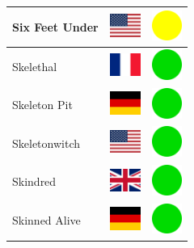 \documentclass[12pt, a4paper, twoside]{report}
\begin{document}
\begin{center}
\begin{longtable}{|p{5cm}|p{2cm}|p{2cm}|}
			Six Feet Under & \includegraphics[width=1cm]{4x3/us} & \includegraphics[width=1cm]{likes/m} \\ \hline
			Skelethal & \includegraphics[width=1cm]{4x3/fr} & \includegraphics[width=1cm]{likes/y} \\ \hline
			Skeleton Pit & \includegraphics[width=1cm]{4x3/de} & \includegraphics[width=1cm]{likes/y} \\ \hline
			Skeletonwitch & \includegraphics[width=1cm]{4x3/us} & \includegraphics[width=1cm]{likes/y} \\ \hline
			Skindred & \includegraphics[width=1cm]{4x3/gb} & \includegraphics[width=1cm]{likes/y} \\ \hline
			Skinned Alive & \includegraphics[width=1cm]{4x3/de} & \includegraphics[width=1cm]{likes/y} \\ \hline

\end{longtable}
\end{center}
\end{document}
